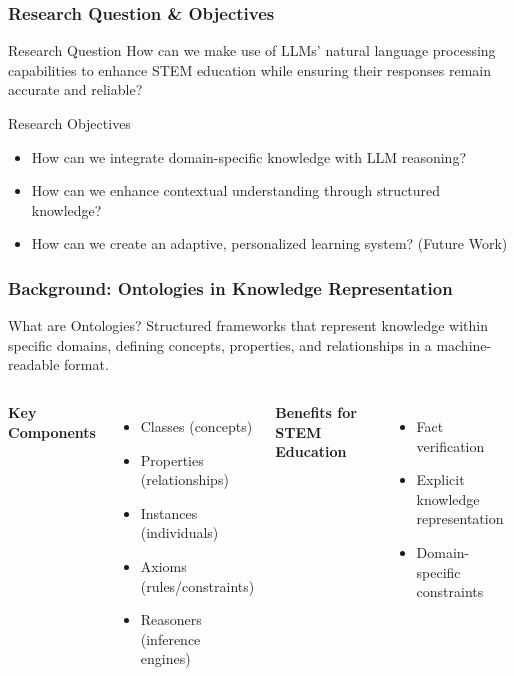\documentclass{beamer}
\begin{document}
\begin{frame}
\frametitle{Research Question \& Objectives}

\begin{alertblock}{Research Question}
How can we make use of LLMs' natural language processing capabilities to enhance STEM education while ensuring their responses remain accurate and reliable?
\end{alertblock}

\begin{block}{Research Objectives}
\begin{itemize}
    \item How can we integrate domain-specific knowledge with LLM reasoning?
    \item How can we enhance contextual understanding through structured knowledge?
    \item How can we create an adaptive, personalized learning system? (Future Work)
\end{itemize}
\end{block}
\end{frame}

\begin{frame}
\frametitle{Background: Ontologies in Knowledge Representation}

\begin{block}{What are Ontologies?}
Structured frameworks that represent knowledge within specific domains, defining concepts, properties, and relationships in a machine-readable format.
\end{block}

\begin{columns}
\textbf{Key Components}
\begin{itemize}
    \item Classes (concepts)
    \item Properties (relationships)
    \item Instances (individuals)
    \item Axioms (rules/constraints)
    \item Reasoners (inference engines)
\end{itemize}

\textbf{Benefits for STEM Education}
\begin{itemize}
    \item \alert{Fact verification}
    \item Explicit knowledge representation
    \item Domain-specific constraints
\end{itemize}
\end{columns}
\end{frame}
\end{document}
